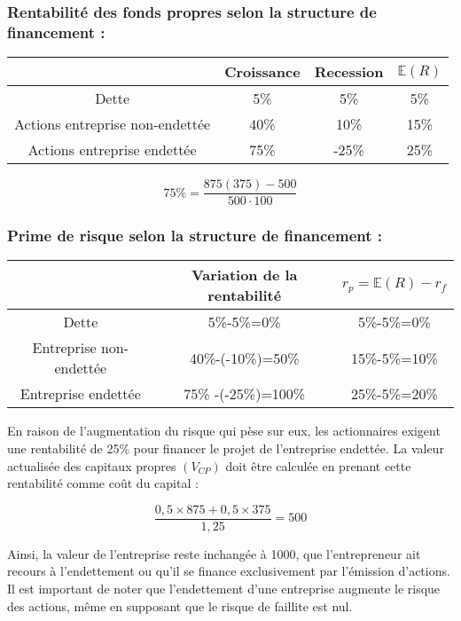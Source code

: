 \documentclass[a4paper, 12pt]{report}
\begin{document}
\subsubsection{Rentabilité des fonds propres selon la structure de financement :}

\begin{center}
	\begin{tabular}{@{}cccc@{}}
		\toprule
		& Croissance & Recession & $\mathbb{E}(R)$ \\ \midrule
		Dette                           & 5\%        & 5\%       & 5\%             \\
		Actions entreprise non-endettée & 40\%       & 10\%      & 15\%            \\
		Actions entreprise endettée     & 75\%       & -25\%     & 25\%            \\ \bottomrule
	\end{tabular}
\end{center}
\[ 75\% = \frac{875(375)-500}{500\cdot100} \]

\subsubsection{Prime de risque selon la structure de financement :}

\begin{center}
	\begin{tabular}{@{}ccc@{}}
	\toprule
	& Variation de la rentabilité & $r_p=\mathbb{E}(R)-r_f$ \\ \midrule
	Dette                   & 5\%-5\%=0\%                 & 5\%-5\%=0\%          \\
	Entreprise non-endettée & 40\%-(-10\%)=50\%           & 15\%-5\%=10\%        \\
	Entreprise endettée     & 75\% -(-25\%)=100\%         & 25\%-5\%=20\%        \\ \bottomrule
\end{tabular}
\end{center}

En raison de l'augmentation du risque qui pèse sur eux, les actionnaires exigent une rentabilité de 25\% pour financer le projet de l'entreprise endettée. La valeur actualisée des capitaux propres \( (V_{CP}) \) doit être calculée en prenant cette rentabilité comme coût du capital : 

\[
\frac{0,5 \times 875 + 0,5 \times 375}{1,25} = 500
\]

Ainsi, la valeur de l'entreprise reste inchangée à 1000, que l'entrepreneur ait recours à l'endettement ou qu'il se finance exclusivement par l'émission d'actions. Il est important de noter que l'endettement d'une entreprise augmente le risque des actions, même en supposant que le risque de faillite est nul.
\end{document}
